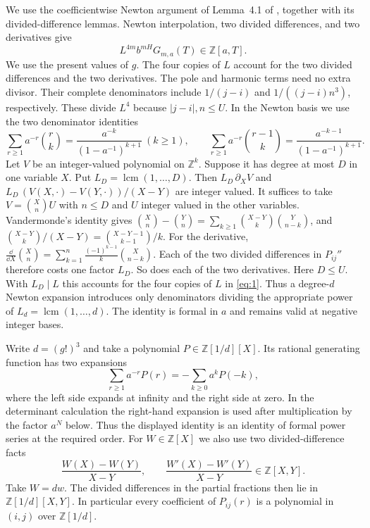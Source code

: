 We use the coefficientwise Newton argument of Lemma~4.1 of \cite{ZhB},
together with its divided-difference lemmas. Newton interpolation, two divided
differences, and two derivatives give
\begin{equation}
 L^{4m}b^{mH}G_{m,a}(T)\in\mathbb Z[a,T].                 \label{eq:1}
\end{equation}
We use the present values of $g$. The four copies of $L$ account for the two
divided differences and the two derivatives. The pole and harmonic terms
need no extra divisor. Their complete denominators include
$1/(j-i)$ and $1/((j-i)n^3)$, respectively. These divide $L^4$ because
$|j-i|,n\le U$. In the Newton basis we use the
two denominator identities
\begin{equation}
 \sum_{r\ge1}a^{-r}\binom r k
   =\frac{a^{-k}}{(1-a^{-1})^{k+1}}\ (k\ge1),\qquad
 \sum_{r\ge1}a^{-r}\binom{r-1}{k}
   =\frac{a^{-k-1}}{(1-a^{-1})^{k+1}}.                    \label{eq:newton-denominators}
\end{equation}
Let $V$ be an integer-valued polynomial on $\mathbb Z^k$. Suppose it has
degree at most $D$ in one variable $X$. Put
$L_D=\operatorname{lcm}(1,\ldots,D)$. Then
$L_D\,\partial_XV$ and $L_D\,(V(X,\cdot)-V(Y,\cdot))/(X-Y)$ are integer
valued.
It suffices to take $V=\binom Xn U$ with $n\le D$ and $U$ integer valued in
the other variables. Vandermonde's identity gives
$\binom Xn-\binom Yn=\sum_{k\ge1}\binom{X-Y}k\binom Y{n-k}$, and
$\binom{X-Y}k/(X-Y)=\binom{X-Y-1}{k-1}/k$. For the derivative,
$\frac{\dd}{\dd X}\binom Xn=\sum_{k=1}^n\frac{(-1)^{k-1}}k\binom X{n-k}$.
Each of the two divided differences in $P_{ij}''$ therefore costs one
factor $L_D$. So does each of the two derivatives. Here $D\le U$.
With $L_D\mid L$ this accounts for the four copies of $L$ in \eqref{eq:1}. Thus a degree-$d$ Newton expansion
introduces only denominators dividing the appropriate power of
$L_d=\operatorname{lcm}(1,\ldots,d)$.
The identity is formal in $a$ and remains valid at negative integer bases.

Write $d=(g!)^3$ and take a polynomial $P\in\mathbb Z[1/d][X]$. Its
rational generating function has two expansions
\begin{equation}
 \sum_{r\ge1}a^{-r}P(r)=-\sum_{k\ge0}a^kP(-k),                 \label{eq:formal-expansions}
\end{equation}
where the left side expands at infinity and the right side at zero.
In the determinant calculation the right-hand expansion is
used after multiplication by the factor $a^N$ below.
Thus the displayed identity is an identity of formal power series at the
required order.
For $W\in\mathbb Z[X]$ we also use two divided-difference facts
\begin{equation}
 \frac{W(X)-W(Y)}{X-Y},\qquad
 \frac{W'(X)-W'(Y)}{X-Y}\in\mathbb Z[X,Y].                    \label{eq:divided-differences}
\end{equation}
Take $W=d w$. The divided differences in the partial fractions then lie
in $\mathbb Z[1/d][X,Y]$. In particular every coefficient of
$P_{ij}(r)$ is a polynomial in $(i,j)$ over $\mathbb Z[1/d]$.

